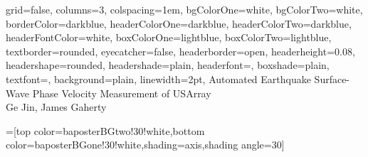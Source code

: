 \documentclass[paperwidth=60in,paperheight=40in,landscape,fontscale=0.30]{baposter}
\begin{document}
\begin{poster}{
  grid=false,
  columns=3,
  colspacing=1em,
  bgColorOne=white,
  bgColorTwo=white,
  borderColor=darkblue,
  headerColorOne=darkblue,
  headerColorTwo=darkblue,
  headerFontColor=white,
  boxColorOne=lightblue,
  boxColorTwo=lightblue,
  textborder=rounded,
  eyecatcher=false,
  headerborder=open,
  headerheight=0.08\textheight,  %
  headershape=rounded,
  headershade=plain,
  headerfont=\LARGE\textsf, %
  boxshade=plain,
  textfont={\setlength{\parindent}{1.2em}},
  background=plain,
  linewidth=2pt,
  }
  {} %
  {\sf %
	 Automated Earthquake Surface-Wave Phase Velocity Measurement of USArray
  }
  {\sf %
  \\
	{\LARGE Ge Jin, James Gaherty}
  }
  {
\setlength\fboxsep{0pt}
\setlength\fboxrule{0.0pt}
  }

  =[top color=baposterBGtwo!30!white,bottom color=baposterBGone!30!white,shading=axis,shading angle=30]

     \newlength{\leftimgwidth}
     \setlength{\leftimgwidth}{0.78em+8.0em}


\end{poster}
\end{document}
